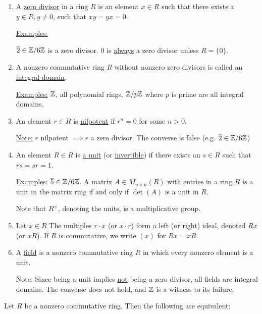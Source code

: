 \documentclass[x11names,reqno,14pt]{extarticle}
\begin{document}
\begin{enumerate}

\item

A \underline{zero divisor} in a ring $R$ is an element $x \in R$ such that there exists a $y \in R, y\neq0$, such that $xy = yx = 0$. 

\underline{Examples:}

$\overline{2} \in \mathbb{Z}/6\mathbb{Z}$ is a zero divisor. 0 is \underline{always} a zero divisor unless $R = \{0\}$. 

\item A nonzero commutative ring $R$ without nonzero zero divisors is called an \underline{integral domain}. 

\underline{Examples:} $\mathbb{Z}$, all polynomial rings, $\mathbb{Z}/p\mathbb{Z}$ where $p$ is prime are all integral domains. 

\item An element $r \in R$ is \underline{nilpotent} if $r^n = 0$ for some $n > 0$. 

\underline{Note:} $r$ nilpotent $\implies r$ a zero divisor. The converse is false (e.g. $\overline{2}\in\mathbb{Z}/6\mathbb{Z}$)

\item An element $R \in R$ is \underline{a unit} (or \underline{invertible}) if there exists an $s \in R$ such that $rs = sr = 1$. 

\underline{Examples:} $\overline{5} \in \mathbb{Z}/6\mathbb{Z}$. A matrix $A \in M_{n\times n}(R)$ with entries in a ring $R$ is a unit in the matrix ring if and only if $\det(A)$ is a unit in $R$.

Note that $R^\times$, denoting the units, is a multiplicative group. 

\item Let $x \in R$ The multiples $r\cdot x$ (or $x \cdot r$) form a left (or right) ideal, denoted \underline{$Rx$} (or \underline{$xR$}). If $R$ is commutative, we write \underline{$(x)$} for $Rx = xR$. 

\item A \underline{field} is a nonzero commutative ring $R$ in which every nonzero element is a unit. 

Note: Since being a unit implies \underline{not} being a zero divisor, all fields are integral domains. The converse does not hold, and $\mathbb{Z}$ is a witness to its failure. 

\end{enumerate}

\prop

Let $R$ be a nonzero commutative ring. Then the following are equivalent: 
\end{document}
